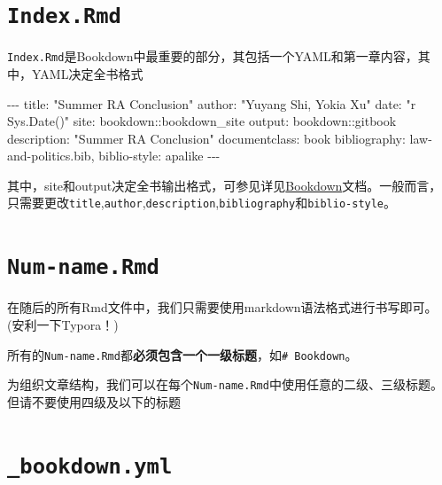 \documentclass[
  letterpaper,
  DIV=11,
  numbers=noendperiod,
  oneside]{scrreprt}
\newenvironment{Shaded}{}{}
\newcommand{\NormalTok}[1]{\textcolor[rgb]{0.14,0.16,0.18}{#1}}
\newcommand{\SpecialCharTok}[1]{\textcolor[rgb]{0.00,0.36,0.77}{#1}}
\newcommand{\StringTok}[1]{\textcolor[rgb]{0.01,0.18,0.38}{#1}}
\begin{document}
\hypertarget{index.rmd}{%
\section{\texorpdfstring{\texttt{Index.Rmd}}{Index.Rmd}}\label{index.rmd}}

\texttt{Index.Rmd}是Bookdown中最重要的部分，其包括一个YAML和第一章内容，其中，YAML决定全书格式

\begin{Shaded}
\begin{Highlighting}[]
\SpecialCharTok{{-}{-}{-}}
\NormalTok{title}\SpecialCharTok{:} \StringTok{"Summer RA Conclusion"}
\NormalTok{author}\SpecialCharTok{:} \StringTok{"Yuyang Shi, Yokia Xu"}
\NormalTok{date}\SpecialCharTok{:} \StringTok{"\textasciigrave{}r Sys.Date()\textasciigrave{}"}
\NormalTok{site}\SpecialCharTok{:}\NormalTok{ bookdown}\SpecialCharTok{::}\NormalTok{bookdown\_site}
\NormalTok{output}\SpecialCharTok{:}\NormalTok{ bookdown}\SpecialCharTok{::}\NormalTok{gitbook}
\NormalTok{description}\SpecialCharTok{:} \StringTok{"Summer RA Conclusion"}
\NormalTok{documentclass}\SpecialCharTok{:}\NormalTok{ book}
\NormalTok{bibliography}\SpecialCharTok{:}\NormalTok{ law}\SpecialCharTok{{-}}\NormalTok{and}\SpecialCharTok{{-}}\NormalTok{politics.bib,}
\NormalTok{biblio}\SpecialCharTok{{-}}\NormalTok{style}\SpecialCharTok{:}\NormalTok{ apalike}
\SpecialCharTok{{-}{-}{-}}
\end{Highlighting}
\end{Shaded}

其中，site和output决定全书输出格式，可参见详见\href{https://bookdown.org/}{Bookdown}文档。一般而言，只需要更改\texttt{title},\texttt{author},\texttt{description},\texttt{bibliography}和\texttt{biblio-style}。

\hypertarget{num-name.rmd}{%
\section{\texorpdfstring{\texttt{Num-name.Rmd}}{Num-name.Rmd}}\label{num-name.rmd}}

在随后的所有Rmd文件中，我们只需要使用markdown语法格式进行书写即可。(安利一下Typora！)

所有的\texttt{Num-name.Rmd}都\textbf{必须包含一个一级标题}，如\texttt{\#\ Bookdown}。

为组织文章结构，我们可以在每个\texttt{Num-name.Rmd}中使用任意的二级、三级标题。但请不要使用四级及以下的标题

\hypertarget{bookdown.yml}{%
\section{\texorpdfstring{\texttt{\_bookdown.yml}}{\_bookdown.yml}}\label{bookdown.yml}}
\end{document}
